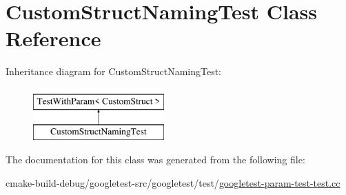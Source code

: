 \hypertarget{classCustomStructNamingTest}{}\section{Custom\+Struct\+Naming\+Test Class Reference}
\label{classCustomStructNamingTest}
Inheritance diagram for Custom\+Struct\+Naming\+Test\+:\begin{figure}[H]
\begin{center}
\leavevmode
\includegraphics[height=2.000000cm]{classCustomStructNamingTest}
\end{center}
\end{figure}


The documentation for this class was generated from the following file\+:\begin{DoxyCompactItemize}
\item 
cmake-\/build-\/debug/googletest-\/src/googletest/test/\mbox{\hyperlink{googletest-param-test-test_8cc}{googletest-\/param-\/test-\/test.\+cc}}\end{DoxyCompactItemize}
